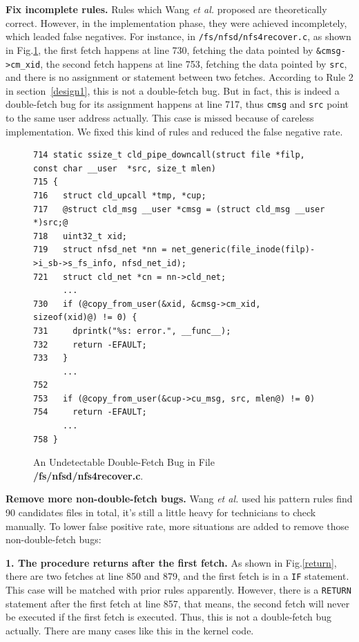\documentclass[10pt]{llncs}
\begin{document}
\textbf{Fix incomplete rules.}
Rules which Wang \textit{et al.} proposed are theoretically correct. However, in the implementation phase, they were achieved incompletely, which leaded false negatives. For instance, in \verb:/fs/nfsd/nfs4recover.c:, as shown in Fig.\ref{fix}, the first fetch happens at line 730, fetching the data pointed by \verb:&cmsg->cm_xid:, the second fetch happens at line 753, fetching the data pointed by \verb:src:, and there is no assignment or statement between two fetches. According to Rule 2 in section~\ref{design1}, this is not a double-fetch bug. But in fact, this is indeed a double-fetch bug for its assignment happens at line 717, thus \verb:cmsg: and \verb:src: point to the same user address actually. This case is missed because of careless implementation. We fixed this kind of rules and reduced the false negative rate.

\begin{figure}[t]
  \centering
\begin{lstlisting}[style=code]
714 static ssize_t cld_pipe_downcall(struct file *filp, const char __user  *src, size_t mlen)
715 {
716   struct cld_upcall *tmp, *cup;
717   @struct cld_msg __user *cmsg = (struct cld_msg __user *)src;@
718   uint32_t xid;
719   struct nfsd_net *nn = net_generic(file_inode(filp)->i_sb->s_fs_info, nfsd_net_id);
721   struct cld_net *cn = nn->cld_net;
	  ...
730   if (@copy_from_user(&xid, &cmsg->cm_xid, sizeof(xid)@) != 0) {
731     dprintk("%s: error.", __func__);
732     return -EFAULT;
733   }
	  ...
752 
753   if (@copy_from_user(&cup->cu_msg, src, mlen@) != 0)
754     return -EFAULT;
	  ...
758 }
\end{lstlisting}
  \caption{An Undetectable Double-Fetch Bug in File \textbf{/fs/nfsd/nfs4recover.c}.}
  \label{fix}
\end{figure}


\textbf{Remove more non-double-fetch bugs.}
Wang \textit{et al.} used his pattern rules find 90 candidates files in total, it's still a little heavy for technicians to check manually. To lower false positive rate, more situations are added to remove those non-double-fetch bugs:

\textbf{1. The procedure returns after the first fetch.}
As shown in Fig.\ref{return}, there are two fetches at line 850 and 879, and the first fetch is in a \verb:IF: statement. This case will be matched with prior rules apparently. However, there is a \verb:RETURN: statement after the first fetch at line 857, that means, the second fetch will never be executed if the first fetch is executed. Thus, this is not a double-fetch bug actually. There are many cases like this in the kernel code.
\end{document}

